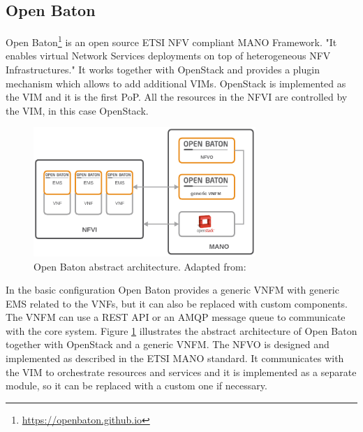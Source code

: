 \subsection{Open Baton}
Open Baton\footnote{\url{https://openbaton.github.io}} is an open source \ac{ETSI} \ac{NFV} compliant \ac{MANO} Framework\autocite[cf.]{openBatonDoc}.
"It enables virtual Network Services deployments on top of heterogeneous \ac{NFV} Infrastructures."\autocite{openBatonDoc}
It works together with OpenStack and provides a plugin mechanism which allows to add additional \acp{VIM}.\autocite[cf.]{openBatonDoc}
OpenStack is implemented as the \ac{VIM} and it is the first \ac{PoP}.\autocite{openBatonDoc}
All the resources in the \ac{NFVI} are controlled by the \ac{VIM}, in this case OpenStack.

\begin{figure}[H]
    \centering
    \includegraphics[width=0.75\textwidth]{resources/images/open_baton_simple_architecture.png}
    \caption[Open Baton abstract architecture]{Open Baton abstract architecture. Adapted from: \autocite{openBatonDoc}}
    \label{fig:open_baton_abstract_architecture}
\end{figure}

In the basic configuration Open Baton provides a generic \ac{VNFM} with generic \ac{EMS} related to the \acp{VNF}, but it can also be replaced with custom components.
The \ac{VNFM} can use a \ac{REST} \ac{API} or an \ac{AMQP} message queue to communicate with the core system.
Figure \ref{fig:open_baton_abstract_architecture} illustrates the abstract architecture of Open Baton together with OpenStack and a generic \ac{VNFM}.
The \ac{NFVO} is designed and implemented as described in the \ac{ETSI} \ac{MANO} standard.\autocite{openBatonDoc}
It communicates with the \ac{VIM} to orchestrate resources and services and it is implemented as a separate module, so it can be replaced with a custom one if necessary.


